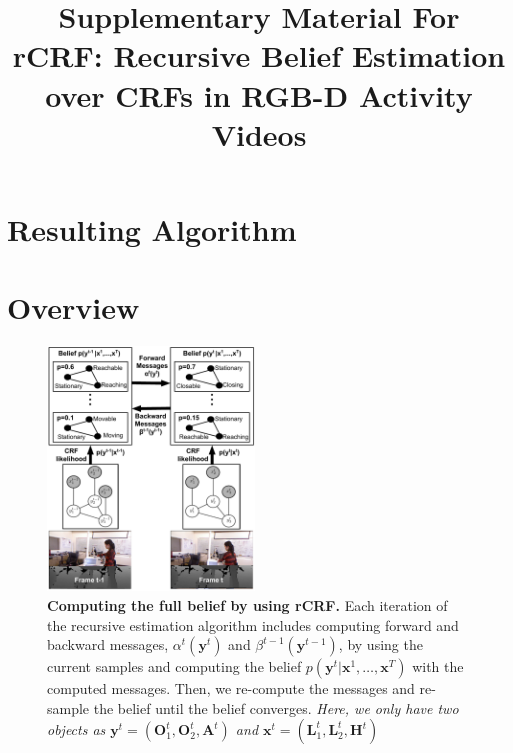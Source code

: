 \documentclass[conference]{IEEEtran}
\begin{document}
\title{Supplementary Material For \\ rCRF: Recursive Belief Estimation over CRFs in RGB-D Activity Videos}

\author{
\and
{}
}


\maketitle

\IEEEpeerreviewmaketitle
\section{Resulting Algorithm}
\section{Overview}
\vspace{\subsectionReduceTop}
\label{overview}
\begin{figure}[h!]
  \includegraphics[width=0.49\textwidth]{systemflow}
  \vspace{\captionReduceTop}
  \caption{{\bf Computing the full belief by using rCRF.} Each iteration of the recursive estimation algorithm includes computing forward and backward messages, $\alpha^t(\mathbf{y}^t)$ and $\beta^{t-1}(\mathbf{y}^{t-1})$, by using the current samples and computing the belief $p(\mathbf{y}^t|\mathbf{x}^1,\ldots,\mathbf{x}^T)$ with the computed messages. Then, we re-compute the messages and re-sample the belief until the belief converges. \emph{Here, we only have two objects as  $\mathbf{y}^t=(\mathbf{O}^t_1,\mathbf{O}^t_2,\mathbf{A}^t)$ and $\mathbf{x}^t=(\mathbf{L}^t_1,\mathbf{L}^t_2,\mathbf{H}^t)$ }}
  \vspace{\captionReduceBot}
  \label{system}
\end{figure}
\end{document}
